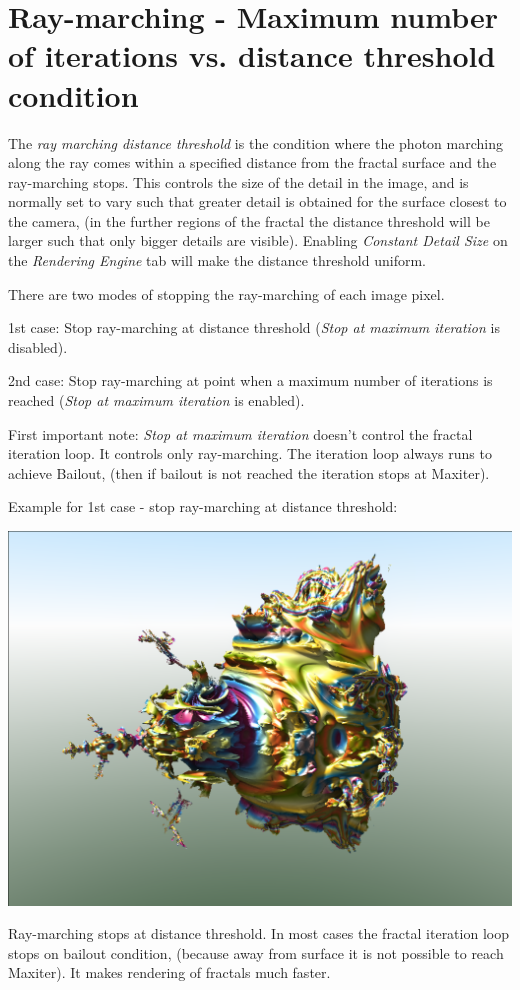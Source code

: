 \section{Ray-marching - Maximum number of iterations vs. distance threshold
	condition}\label{ray-marching---maximum-number-of-iterations-vs.-distance-threshold-condition}

The \emph{ray marching distance threshold} is the condition where the photon
marching along the ray comes within a specified distance from the fractal
surface and the ray-marching stops. This controls the size of the detail in the
image, and is normally set to vary such that greater detail is obtained for the
surface closest to the camera, (in the further regions of the fractal the
distance threshold will be larger such that only bigger details are visible).
Enabling \emph{Constant Detail Size} on the \emph{Rendering Engine} tab will
make the distance threshold uniform.

There are two modes of stopping the ray-marching of each image pixel.

1st case: Stop ray-marching at distance threshold (\emph{Stop at maximum
	iteration} is disabled).

2nd case: Stop ray-marching at point when a maximum number of iterations is
reached (\emph{Stop at maximum iteration} is enabled).

First important note: \emph{Stop at maximum iteration} doesn't control the
fractal iteration loop. It controls only ray-marching. The iteration loop always
runs to achieve Bailout, (then if bailout is not reached the iteration stops at
Maxiter).

Example for 1st case - stop ray-marching at distance threshold: \nopagebreak

\includegraphics[width=0.5\linewidth]{img/manual/media/stop_raymarching_at_disttrhersh}

Ray-marching stops at distance threshold. In most cases the fractal iteration
loop stops on bailout condition, (because away from surface it is not possible
to reach Maxiter). It makes rendering of fractals much faster.

